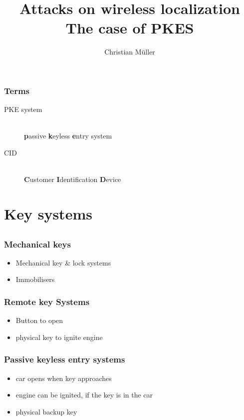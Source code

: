\documentclass[12pt]{beamer}
\title{Attacks on wireless localization\\ The case of PKES}
\author{Christian Müller}
\begin{document}
	\begin{frame}
		\titlepage
	\end{frame}

	\begin{frame}
		\tableofcontents
	\end{frame}

	\begin{frame}
		\frametitle{Terms}
			\begin{description}
				\item[PKE system]\hfill \\
						\textbf{p}assive \textbf{k}eyless \textbf{e}ntry system
				\item[CID] \hfill \\
					\textbf{C}ustomer \textbf{I}dentification \textbf{D}evice
			\end{description}
	\end{frame}
	
\section{Key systems}
\subsection*{}
	\begin{frame}
		\frametitle{Mechanical keys}
		\begin{itemize}
			\onslide<1-2>			
			\item Mechanical key \& lock systems
			\onslide<2-2>
			\item Immobilisers
		\end{itemize}
	\end{frame}
	
	\begin{frame}
		\frametitle{Remote key Systems}
		\begin{itemize}
			\item Button to open
			\item physical key to ignite engine
		\end{itemize}
	\end{frame}

	\begin{frame}
		\frametitle{Passive keyless entry systems}
		\begin{itemize}
			\item car opens when key approaches
			\item engine can be ignited, if the key is in the car
			\item physical backup key
		\end{itemize}
	\end{frame}
\end{document}
